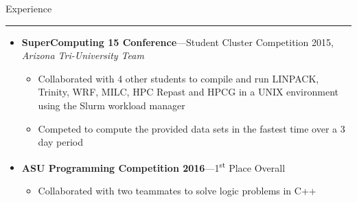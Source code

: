 \documentclass[10pt,oneside]{article}
\newcommand{\sectitle}[1]{
	\begin{flushleft}{\fontfamily{phv}\selectfont\Large#1}\end{flushleft}
}
\newenvironment{ressection}[1]{
	\vspace{2pt}
	\sectitle{#1}
	\vspace{-10pt}\rule{\textwidth}{0.5pt}
	\vspace{-10pt}
	\begin{itemize}
	\vspace{3pt}
}{
	\end{itemize}
}
\newcommand{\ressubitem}[1]{
	\vspace{-1pt}
	\item \begin{flushleft} #1 \end{flushleft}
}
\newcommand{\resmeditem}[2]{
	\vspace{-5pt}
	\item
	\textbf{#1}---#2
}
\newcommand{\resbigitemline}[3]{
	\vspace{-5pt}
	\item
	\textbf{#1}---#2, 
	\textit{#3}
}
\newenvironment{ressubsecshort}[2]{
	\resmeditem{#1}{#2}
	\vspace{-2pt}
	\begin{itemize}
	}{
	\end{itemize}
}
\newenvironment{ressubsecline}[3]{
	\resbigitemline{#1}{#2}{#3}
	\vspace{-2pt}
	\begin{itemize}
}{
	\end{itemize}
}
\begin{document}
\begin{ressection}{Experience}
	\begin{ressubsecline}{SuperComputing 15 Conference}{Student Cluster Competition 2015}{Arizona Tri-University Team}
		\ressubitem{Collaborated with 4 other students to compile and run LINPACK, Trinity, WRF, MILC, HPC Repast and
		HPCG in a UNIX environment using the Slurm workload manager}
		\ressubitem{Competed to compute the provided data sets in the fastest time over a 3 day period}
	\end{ressubsecline}
	\begin{ressubsecshort}{ASU Programming Competition 2016}{1\textsuperscript{st} Place Overall}
		\ressubitem{Collaborated with two teammates to solve logic problems in C++}
	\end{ressubsecshort}
\end{ressection}
\end{document}
